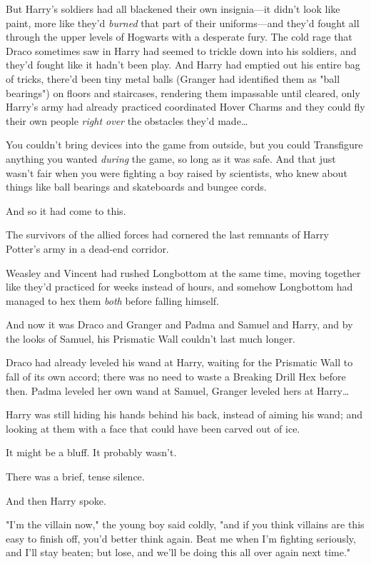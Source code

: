 But Harry's soldiers had all blackened their own insignia---it didn't look like 
paint, more like they'd \emph{burned} that part of their uniforms---and they'd 
fought all through the upper levels of Hogwarts with a desperate fury. The cold 
rage that Draco sometimes saw in Harry had seemed to trickle down into his 
soldiers, and they'd fought like it hadn't been play. And Harry had emptied out 
his entire bag of tricks, there'd been tiny metal balls (Granger had identified 
them as "ball bearings") on floors and staircases, rendering them impassable 
until cleared, only Harry's army had already practiced coordinated Hover Charms 
and they could fly their own people \emph{right over} the obstacles they'd 
made{\ldots}

You couldn't bring devices into the game from outside, but you could 
Transfigure anything you wanted \emph{during} the game, so long as it was safe. 
And that just wasn't fair when you were fighting a boy raised by scientists, 
who knew about things like ball bearings and skateboards and bungee cords.

And so it had come to this.

The survivors of the allied forces had cornered the last remnants of Harry 
Potter's army in a dead-end corridor.

Weasley and Vincent had rushed Longbottom at the same time, moving together 
like they'd practiced for weeks instead of hours, and somehow Longbottom had 
managed to hex them \emph{both} before falling himself.

And now it was Draco and Granger and Padma and Samuel and Harry, and by the 
looks of Samuel, his Prismatic Wall couldn't last much longer.

Draco had already leveled his wand at Harry, waiting for the Prismatic Wall to 
fall of its own accord; there was no need to waste a Breaking Drill Hex before 
then. Padma leveled her own wand at Samuel, Granger leveled hers at 
Harry{\ldots}

Harry was still hiding his hands behind his back, instead of aiming his wand; 
and looking at them with a face that could have been carved out of ice.

It might be a bluff. It probably wasn't.

There was a brief, tense silence.

And then Harry spoke.

"I'm the villain now," the young boy said coldly, "and if you think villains 
are this easy to finish off, you'd better think again. Beat me when I'm 
fighting seriously, and I'll stay beaten; but lose, and we'll be doing this all 
over again next time."

